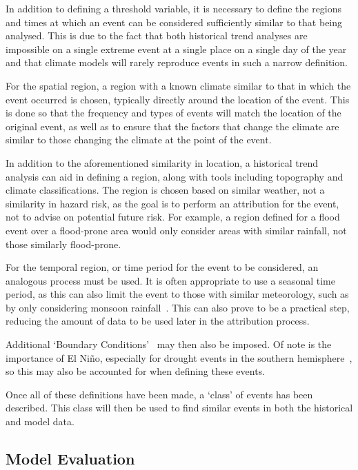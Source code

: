 In addition to defining a threshold variable,
    it is necessary to define the regions and times at which an event can be considered sufficiently similar to that being analysed.
This is due to the fact that both historical trend analyses are impossible on a single extreme event at a single place on a single day of the year
    and that climate models will rarely reproduce events in such a narrow definition.

For the spatial region,
    a region with a known climate similar to that in which the event occurred is chosen,
    typically directly around the location of the event.
This is done so that the frequency and types of events will match the location of the original event,
    as well as to ensure that the factors that change the climate
    are similar to those changing the climate at the point of the event.

In addition to the aforementioned similarity in location,
    a historical trend analysis can aid in defining a region,
    along with tools including topography and climate classifications.
The region is chosen based on similar weather,
    not a similarity in hazard risk,
    as the goal is to perform an attribution for the event,
    not to advise on potential future risk.
For example,
    a region defined for a flood event over a flood-prone area would only consider areas with similar rainfall,
    not those similarly flood-prone.

For the temporal region,
    or time period for the event to be considered,
    an analogous process must be used.
It is often appropriate to use a seasonal time period,
    as this can also limit the event to those with similar meteorology,
    such as by only considering monsoon rainfall~\cite{Otto_et_al_2023}.
This can also prove to be a practical step,
    reducing the amount of data to be used later in the attribution process.

Additional `Boundary Conditions'~\cite{van_Oldenborgh_et_al_2021} may then also be imposed.
Of note is the importance of  El Niño,
    especially for drought events in the southern hemisphere~\cite{Lyon_2004},
    so this may also be accounted for when defining these events.

Once all of these definitions have been made,
    a `class' of events has been described.
This class will then be used to find similar events in both the historical and model data.

\subsection{Model Evaluation}\label{subsec:backmodeleval}

